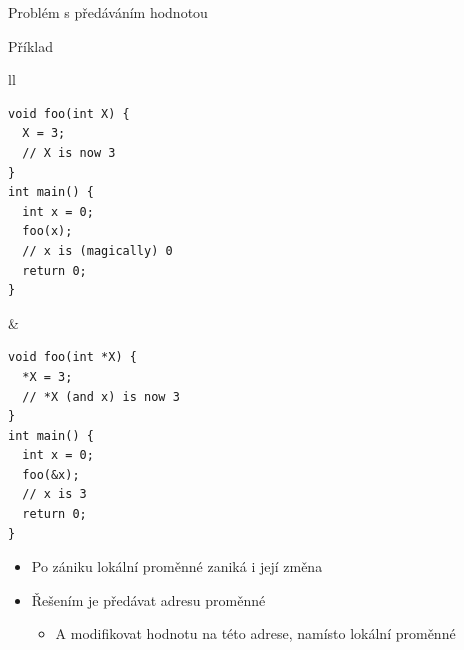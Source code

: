 \begin{frame}[fragile]{Problém s předáváním hodnotou}

\begin{block}{Příklad}
\begin{center}
\begin{tabular}{ll}
\begin{lstlisting}
void foo(int X) {
  X = 3;
  // X is now 3
}
int main() {
  int x = 0;
  foo(x);
  // x is (magically) 0
  return 0;
}
\end{lstlisting}
& ~~~~~~~~~
\begin{lstlisting}
void foo(int *X) {
  *X = 3;
  // *X (and x) is now 3
}
int main() {
  int x = 0;
  foo(&x);
  // x is 3
  return 0;
}
\end{lstlisting}
\end{tabular}
\end{center}
\end{block}


  \begin{itemize}
    \item Po zániku lokální proměnné zaniká i její změna

    \pause

    \item Řešením je předávat adresu proměnné
    \begin{itemize}
      \item A modifikovat hodnotu na této adrese, namísto lokální proměnné
    \end{itemize}

  \end{itemize}

\end{frame}


